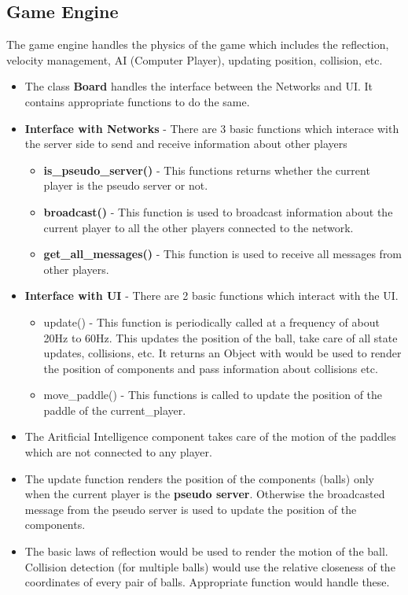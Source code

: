 \documentclass{article}
\begin{document}
    \subsection{Game Engine}
        The game engine handles the physics of the game which includes the reflection, velocity management, AI (Computer Player), updating position, collision, etc.
        \begin{itemize}
            \item The class \textbf{Board} handles the interface between the Networks and UI. It contains appropriate functions to do the same.
            \item \textbf{Interface with Networks} - There are 3 basic functions which interace with the server side to send and receive information about other players
            \begin{itemize}
                \item \textbf{is\_pseudo\_server()} - This functions returns whether the current player is the pseudo server or not.
                \item \textbf{broadcast()} - This function is used to broadcast information about the current player to all the other players connected to the network.
                \item \textbf{get\_all\_messages()} - This function is used to receive all messages from other players.
            \end{itemize}
            \item \textbf{Interface with UI} - There are 2 basic functions which interact with the UI.
            \begin{itemize}
                \item update() - This function is periodically called at a frequency of about 20Hz to 60Hz. This updates the position of the ball, take care of all state updates, collisions, etc. It returns an Object with would be used to render the position of components and pass information about collisions etc.
                \item move\_paddle() - This functions is called to update the position of the paddle of the current_player.
            \end{itemize}
            \item The Aritficial Intelligence component takes care of the motion of the paddles which are not connected to any player.
            \item The update function renders the position of the components (balls) only when the current player is the \textbf{pseudo server}. Otherwise the broadcasted message from the pseudo server is used to update the position of the components.
            \item The basic laws of reflection would be used to render the motion of the ball. Collision detection (for multiple balls) would use the relative closeness of the coordinates of every pair of balls. Appropriate function would handle these.
        \end{itemize}
\end{document}
